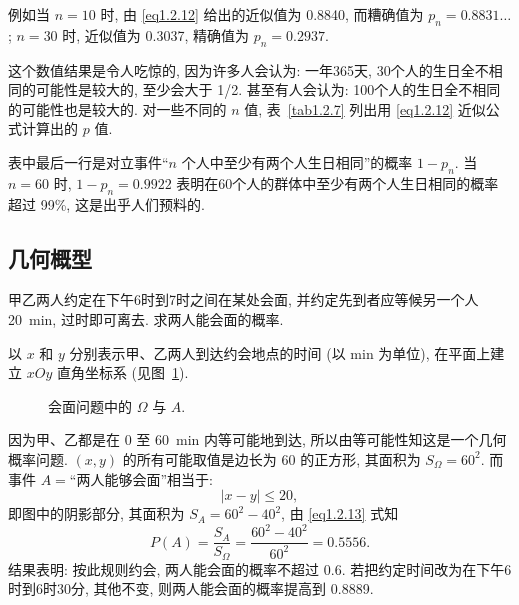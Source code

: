\begin{solution}
    例如当 $n = 10$ 时,
    由 \eqref{eq1.2.12} 给出的近似值为 \num{0.8840},
    而糟确值为 $p_n = 0.8831\dots$;
    $n = 30$ 时,
    近似值为 \num{0.3037},
    精确值为 $p_n = 0.2937$.

    这个数值结果是令人吃惊的,
    因为许多人会认为:
    一年365天,
    30个人的生日全不相同的可能性是较大的,
    至少会大于 1/2.
    甚至有人会认为:
    100个人的生日全不相同的可能性也是较大的.
    对一些不同的 $n$ 值,
    表~\ref{tab1.2.7} 列出用 \eqref{eq1.2.12} 近似公式计算出的 $p$ 值.



    表中最后一行是对立事件“$n$ 个人中至少有两个人生日相同”的概率 $1 - p_n$.
    当 $n = 60$ 时,
    $1 - p_n = 0.9922$ 表明在60个人的群体中至少有两个人生日相同的概率超过 99\%,
    这是出乎人们预料的.
\end{solution}

\subsection{几何概型}

\begin{example}[会商问题]
    甲乙两人约定在下午6时到7时之间在某处会面,
    并约定先到者应等候另一个人 \SI{20}{\minute},
    过时即可离去.
    求两人能会面的概率.
\end{example}

\begin{solution}
    以 $x$ 和 $y$ 分别表示甲、乙两人到达约会地点的时间 (以 \si{\minute} 为单位),
    在平面上建立 $xOy$ 直角坐标系 (见图~\ref{fig1.2.3}).

    \begin{figure}[!ht]
        \centering
        \caption{会面问题中的 $\Omega$ 与 $A$.}
        \label{fig1.2.3}
    \end{figure}

    因为甲、乙都是在 0 至 \SI{60}{\minute} 内等可能地到达,
    所以由等可能性知这是一个几何概率问题.
    $(x, y)$ 的所有可能取值是边长为 60 的正方形,
    其面积为 $S_\Omega = 60^2$.
    而事件 $A =$“两人能够会面”相当于:
    \[
        | x - y | \le 20,
    \]
    即图中的阴影部分,
    其面积为 $S_A = 60^2 - 40^2$,
    由 \eqref{eq1.2.13} 式知
    \[
        P (A) = \frac{S_A}{S_\Omega} = \frac{60^2 - 40^2}{60^2} = 0.5556.
    \]
    结果表明:
    按此规则约会,
    两人能会面的概率不超过 0.6.
    若把约定时间改为在下午6时到6时30分,
    其他不变,
    则两人能会面的概率提高到 \num{0.8889}.
\end{solution}


